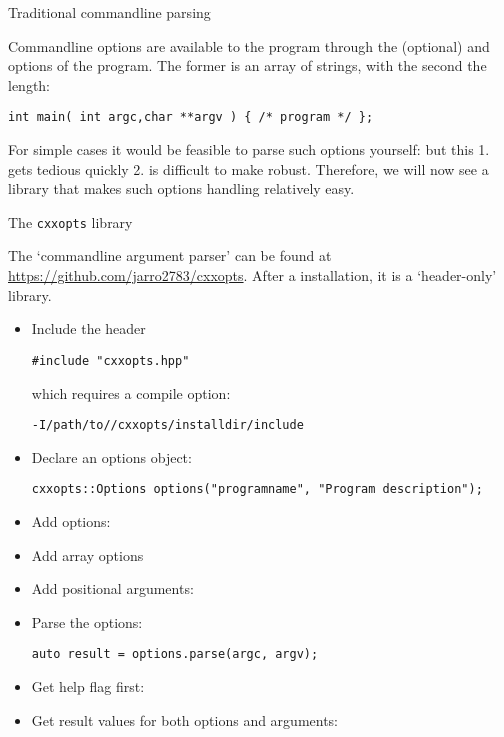  {Traditional commandline parsing}

Commandline options are available to the program through the
(optional)
 and  options of the  program.
The former is an array of strings, with the second the length:
\begin{lstlisting}
int main( int argc,char **argv ) { /* program */ };
\end{lstlisting}

For simple cases it would be feasible to parse such options yourself:
but this 1. gets tedious quickly 2. is difficult to make robust.
Therefore, we will now see a library that makes such options handling
relatively easy.

 {The \texttt{cxxopts} library}
\label{sec:cxxopts}

The  `commandline argument parser'
can be found at \url{https://github.com/jarro2783/cxxopts}.
After a  installation, it is a `header-only' library.

\begin{itemize}
\item Include the header
\begin{lstlisting}
#include "cxxopts.hpp"
\end{lstlisting}
which requires a compile option:
\begin{verbatim}
-I/path/to//cxxopts/installdir/include
\end{verbatim}
\item Declare an options object:
\begin{lstlisting}
cxxopts::Options options("programname", "Program description");
\end{lstlisting}

\item Add options:

\item Add array options

\item Add positional arguments:

\item Parse the options:
\begin{lstlisting}
auto result = options.parse(argc, argv);
\end{lstlisting}

\item Get help flag first:

\item Get result values
  for both options and arguments:
\end{itemize}

